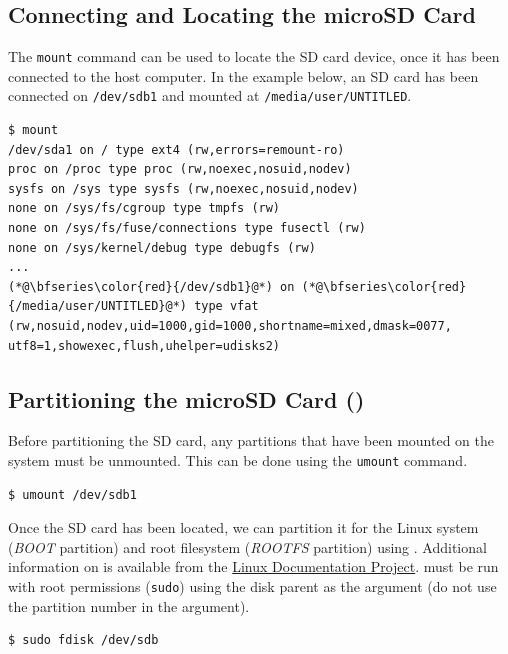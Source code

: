\subsection{Connecting and Locating the microSD Card}

The \texttt{mount} command can be used to locate the SD card device, once it has been connected to the host computer. In the example below, an SD card has been connected on \texttt{/dev/sdb1} and mounted at \texttt{/media/user/UNTITLED}.


\begin{lstlisting}[style=text]
$ mount
/dev/sda1 on / type ext4 (rw,errors=remount-ro)
proc on /proc type proc (rw,noexec,nosuid,nodev)
sysfs on /sys type sysfs (rw,noexec,nosuid,nodev)
none on /sys/fs/cgroup type tmpfs (rw)
none on /sys/fs/fuse/connections type fusectl (rw)
none on /sys/kernel/debug type debugfs (rw)
...
(*@\bfseries\color{red}{/dev/sdb1}@*) on (*@\bfseries\color{red}{/media/user/UNTITLED}@*) type vfat (rw,nosuid,nodev,uid=1000,gid=1000,shortname=mixed,dmask=0077, utf8=1,showexec,flush,uhelper=udisks2)
\end{lstlisting}


\subsection{Partitioning the microSD Card ()}
Before partitioning the SD card, any partitions that have been mounted on the system must be unmounted. This can be done using the \texttt{umount} command.


\begin{lstlisting}
$ umount /dev/sdb1
\end{lstlisting}


Once the SD card has been located, we can partition it for the Linux system (\textit{BOOT} partition) and root filesystem (\textit{ROOTFS} partition) using \href{http://linux.die.net/man/8/fdisk}{}. Additional information on  is available from the \href{http://tldp.org/HOWTO/Partition/fdisk_partitioning.html}{Linux Documentation Project}.  must be run with root permissions (\texttt{sudo}) using the disk parent as the argument (do not use the partition number in the argument). 


\begin{lstlisting}[style=text]
$ sudo fdisk /dev/sdb
\end{lstlisting}


